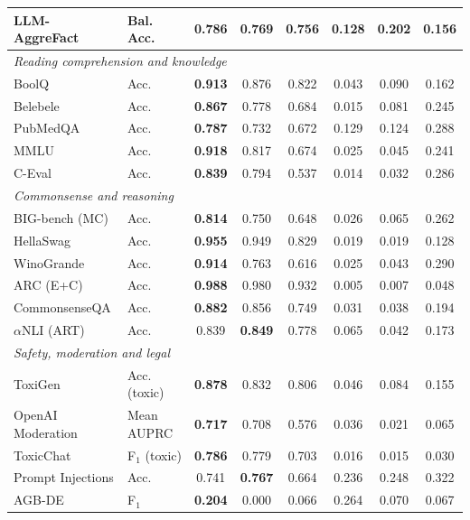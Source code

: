 \begin{tabular}{l l c c c c c c }
    \rowcolor{gray!10}LLM-AggreFact & Bal. Acc. & \textbf{0.786} & 0.769 & 0.756 & 0.128 & 0.202 & 0.156 \\
    \midrule
    \multicolumn{8}{l}{\textit{Reading comprehension and knowledge}} \\
    BoolQ & Acc. & \textbf{0.913} & 0.876 & 0.822 & 0.043 & 0.090 & 0.162 \\
    \rowcolor{gray!10}Belebele & Acc. & \textbf{0.867} & 0.778 & 0.684 & 0.015 & 0.081 & 0.245 \\
    PubMedQA & Acc. & \textbf{0.787} & 0.732 & 0.672 & 0.129 & 0.124 & 0.288 \\
    \rowcolor{gray!10}MMLU & Acc. & \textbf{0.918} & 0.817 & 0.674 & 0.025 & 0.045 & 0.241 \\
    C-Eval & Acc. & \textbf{0.839} & 0.794 & 0.537 & 0.014 & 0.032 & 0.286 \\
    \midrule
    \multicolumn{8}{l}{\textit{Commonsense and reasoning}} \\
    BIG-bench (MC) & Acc. & \textbf{0.814} & 0.750 & 0.648 & 0.026 & 0.065 & 0.262 \\
    \rowcolor{gray!10}HellaSwag & Acc. & \textbf{0.955} & 0.949 & 0.829 & 0.019 & 0.019 & 0.128 \\
    WinoGrande & Acc. & \textbf{0.914} & 0.763 & 0.616 & 0.025 & 0.043 & 0.290 \\
    \rowcolor{gray!10}ARC (E+C) & Acc. & \textbf{0.988} & 0.980 & 0.932 & 0.005 & 0.007 & 0.048 \\
    CommonsenseQA & Acc. & \textbf{0.882} & 0.856 & 0.749 & 0.031 & 0.038 & 0.194 \\
    \rowcolor{gray!10}$\alpha$NLI (ART) & Acc. & 0.839 & \textbf{0.849} & 0.778 & 0.065 & 0.042 & 0.173 \\
    \midrule
    \multicolumn{8}{l}{\textit{Safety, moderation and legal}} \\
    ToxiGen & Acc. (toxic) & \textbf{0.878} & 0.832 & 0.806 & 0.046 & 0.084 & 0.155 \\
    \rowcolor{gray!10}OpenAI Moderation & Mean AUPRC & \textbf{0.717} & 0.708 & 0.576 & 0.036 & 0.021 & 0.065 \\
    ToxicChat & F$_\text{1}$ (toxic) & \textbf{0.786} & 0.779 & 0.703 & 0.016 & 0.015 & 0.030 \\
    \rowcolor{gray!10}Prompt Injections & Acc. & 0.741 & \textbf{0.767} & 0.664 & 0.236 & 0.248 & 0.322 \\
    AGB-DE & F$_\text{1}$ & \textbf{0.204} & 0.000 & 0.066 & 0.264 & 0.070 & 0.067 \\

\end{tabular}
